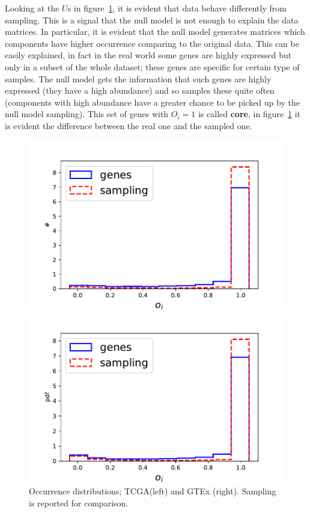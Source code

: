 Looking at the $U$s in figure~\ref{fig:structure/globalU_null}, it is evident that data behave differently from sampling. This is a signal that the null model is not enough to explain the data matrices. In particular, it is evident that the null model generates matrices which components have higher occurrence comparing to the original data. This can be easily explained, in fact in the real world some genes are highly expressed but only in a subset of the whole dataset; these genes are specific for certain type of samples. The null model gets the information that such genes are highly expressed (they have a high abundance) and so samples these quite often (components with high abundance have a greater chance to be picked up by the null model sampling). This set of genes with $O_i=1$ is called \textbf{core}, in figure~\ref{fig:structure/globalU_null} it is evident the difference between the real one and the sampled one.
\begin{figure}[htb!]
\begin{minipage}{0.5\textwidth}
    \centering
    \includegraphics[width=0.95\linewidth]{pictures/structure/tcga/globalU_null.pdf}
\end{minipage}
\hspace{2mm}
\begin{minipage}{0.5\textwidth}
    \centering
    \includegraphics[width=0.95\linewidth]{pictures/structure/gtex/globalU_null.pdf}
    \end{minipage}
\caption{Occurrence distributions; TCGA(left) and GTEx (right). Sampling is reported for comparison.}
\label{fig:structure/globalU_null}
\end{figure}

